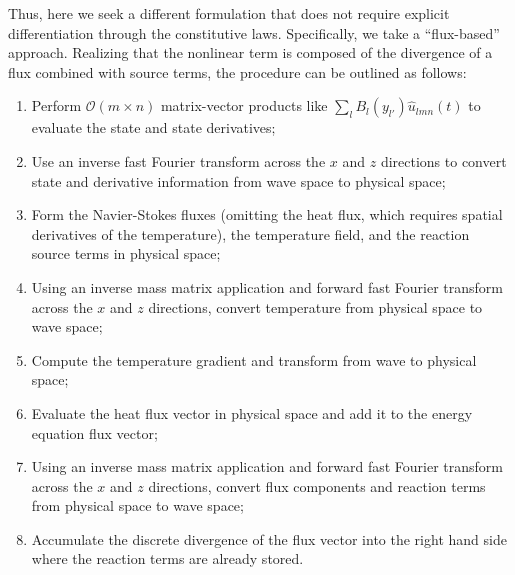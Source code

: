 Thus, here we seek a different formulation that does not require
explicit differentiation through the constitutive laws.  Specifically,
we take a ``flux-based'' approach.  Realizing that the nonlinear term
is composed of the divergence of a flux combined with source terms,
the procedure can be outlined as follows:
%
\begin{enumerate}
\item Perform $\mathcal{O}\!\left(m\times{}n\right)$ matrix-vector
  products like $\sum_{l} B_l\!\left(y_{l'}\right) \hat{u}_{l m
    n}(t)$ to evaluate the state and state derivatives;
\item Use an inverse fast Fourier transform across the $x$ and $z$
  directions to convert state and derivative information from wave
  space to physical space;
\item Form the Navier-Stokes fluxes (omitting the heat flux, which
  requires spatial derivatives of the temperature), the
  temperature field, and the reaction source terms in physical space;
\item Using an inverse mass matrix application and forward fast
  Fourier transform across the $x$ and $z$ directions, convert
  temperature from physical space to wave space;
\item Compute the temperature gradient and transform from wave to
  physical space;
\item Evaluate the heat flux vector in physical space and add it to
  the energy equation flux vector;
\item Using an inverse mass matrix application and forward fast
  Fourier transform across the $x$ and $z$ directions, convert flux
  components and reaction terms from physical space to wave space;
\item Accumulate the discrete divergence of the flux vector into the
  right hand side where the reaction terms are already stored.
\end{enumerate}

